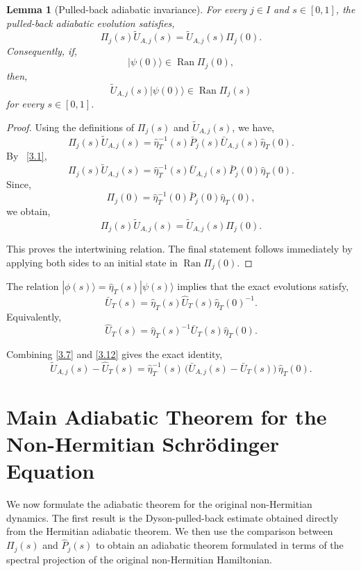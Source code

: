 \documentclass[pdflatex,sn-mathphys-num]{sn-jnl}
\theoremstyle{thmstyleone}
\newtheorem{lemma}[theorem]{Lemma}
\theoremstyle{thmstyletwo}
\theoremstyle{thmstylethree}
\begin{document}
\begin{lemma}[Pulled-back adiabatic invariance]
\label{lem:PulledBackIntertwining}
For every $j\in I$ and $s\in[0,1]$, the pulled-back adiabatic evolution satisfies,
\[
\Pi_j(s)\widetilde U_{A,j}(s)=\widetilde U_{A,j}(s)\Pi_j(0).
\]
Consequently, if,
\[
|\psi(0)\rangle\in\operatorname{Ran}\Pi_j(0),
\]
then,
\[
\widetilde U_{A,j}(s)|\psi(0)\rangle\in\operatorname{Ran}\Pi_j(s)
\]
for every $s\in[0,1]$.
\end{lemma}

\begin{proof}
Using the definitions of $\Pi_j(s)$ and $\widetilde U_{A,j}(s)$, we have,
\[
\Pi_j(s)\widetilde U_{A,j}(s)
=
\hat\eta_T^{-1}(s)\bar P_j(s)\bar U_{A,j}(s)\hat\eta_T(0).
\]
By ~\eqref{3.1},
\[
\Pi_j(s)\widetilde U_{A,j}(s)
=
\hat\eta_T^{-1}(s)\bar U_{A,j}(s)\bar P_j(0)\hat\eta_T(0).
\]
Since,
\[
\Pi_j(0)=\hat\eta_T^{-1}(0)\bar P_j(0)\hat\eta_T(0),
\]
we obtain,
\[
\Pi_j(s)\widetilde U_{A,j}(s)
=
\widetilde U_{A,j}(s)\Pi_j(0).
\]

This proves the intertwining relation. The final statement follows immediately by applying
both sides to an initial state in $\operatorname{Ran}\Pi_j(0)$.
\end{proof}

The relation
\(
|\phi(s)\rangle=\hat\eta_T(s)|\psi(s)\rangle
\)
implies that the exact evolutions satisfy,
\begin{equation}\label{3.11}
\bar U_T(s)
=
\hat\eta_T(s)\hat U_T(s)\hat\eta_T(0)^{-1}.
\end{equation}
Equivalently,
\begin{equation}\label{3.12}
\hat U_T(s)
=
\hat\eta_T(s)^{-1}\bar U_T(s)\hat\eta_T(0).
\end{equation}

Combining \eqref{3.7} and \eqref{3.12} gives the exact identity,
\begin{equation}\label{3.13}
 \widetilde U_{A,j}(s)-\hat U_T(s)
 =
 \hat\eta_T^{-1}(s)\,\big(\bar U_{A,j}(s)-\bar U_T(s)\big)\,\hat\eta_T(0).
\end{equation}

\section{Main Adiabatic Theorem for the Non-Hermitian Schr\"odinger Equation}

We now formulate the adiabatic theorem for the original non-Hermitian dynamics. The first
result is the Dyson-pulled-back estimate obtained directly from the Hermitian adiabatic
theorem. We then use the comparison between \(\Pi_j(s)\) and \(\hat P_j(s)\) to obtain an
adiabatic theorem formulated in terms of the spectral projection of the original
non-Hermitian Hamiltonian.
\end{document}
